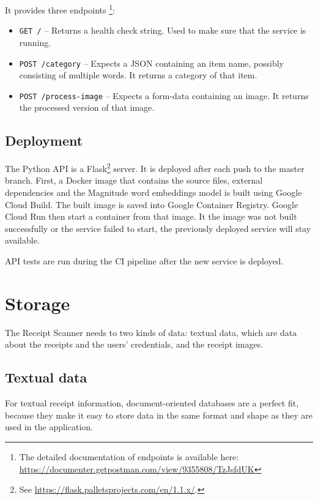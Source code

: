 \documentclass[
  digital, %
  table,   %
  oneside, %
  lof,     %
  lot,     %
]{fithesis3}
\begin{document}
It provides three endpoints \footnote{The detailed documentation of endpoints is available here: \url{https://documenter.getpostman.com/view/9355808/TzJsfdUK}}:

\begin{itemize}
    \item \texttt{GET /} -- Returns a health check string. Used to make sure that the service is running.
    
    \item \texttt{POST /category} -- Expects a JSON containing an item name, possibly consisting of multiple words. It returns a category of that item.
    
    \item \texttt{POST /process-image} -- Expects a form-data containing an image. It returns the processed version of that image.
\end{itemize}

\section{Deployment}
The Python API is a Flask\footnote{See \url{https://flask.palletsprojects.com/en/1.1.x/}.} server. 
It is deployed after each push to the master branch.
First, a Docker image that contains the source files, external dependencies and the Magnitude word embeddings model is built using Google Cloud Build. The built image is saved into Google Container Registry. Google Cloud Run then start a container from that image.
It the image was not built successfully or the service failed to start, the previously deployed service will stay available.

API tests are run during the CI pipeline after the new service is deployed.  

\chapter{Storage}
The Receipt Scanner needs to two kinds of data: textual data, which are data about the receipts and the users' credentials, and the receipt images. 

\section{Textual data}
For textual receipt information, document-oriented databases are a perfect fit, because they make it easy to store data in the same format and shape as they are used in the application. 
\end{document}
